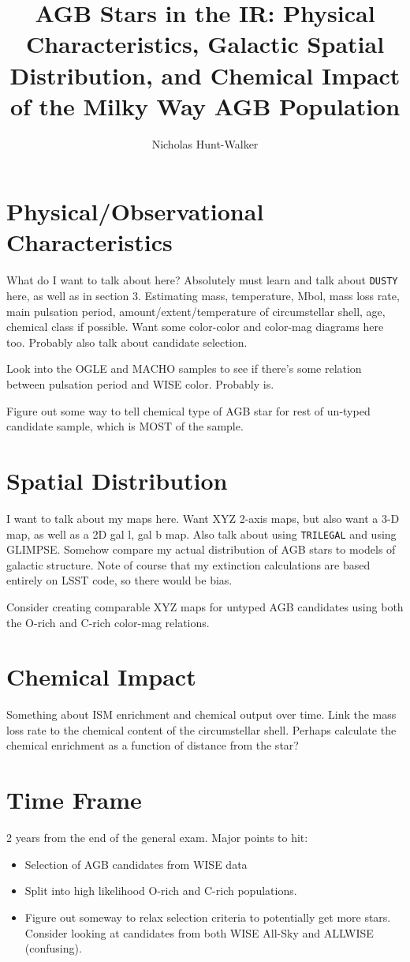 \title{AGB Stars in the IR: Physical Characteristics, Galactic Spatial Distribution, and Chemical Impact of the Milky Way AGB Population}
\author{Nicholas Hunt-Walker}
\maketitle

\section{Physical/Observational Characteristics}
What do I want to talk about here? Absolutely must learn and talk about {\tt DUSTY} here, as well as in section 3.  Estimating mass, temperature, Mbol, mass loss rate, main pulsation period, amount/extent/temperature of circumstellar shell, age, chemical class if possible.  Want some color-color and color-mag diagrams here too.  Probably also talk about candidate selection.

Look into the OGLE and MACHO samples to see if there's some relation between pulsation period and WISE color.  Probably is.

Figure out some way to tell chemical type of AGB star for rest of un-typed candidate sample, which is MOST of the sample.

\section{Spatial Distribution}
I want to talk about my maps here.  Want XYZ 2-axis maps, but also want a 3-D map, as well as a 2D gal l, gal b map.  Also talk about using {\tt TRILEGAL} and using GLIMPSE. Somehow compare my actual distribution of AGB stars to models of galactic structure.  Note of course that my extinction calculations are based entirely on LSST code, so there would be bias.

Consider creating comparable XYZ maps for untyped AGB candidates using both the O-rich and C-rich color-mag relations.

\section{Chemical Impact}
Something about ISM enrichment and chemical output over time. Link the mass loss rate to the chemical content of the circumstellar shell.  Perhaps calculate the chemical enrichment as a function of distance from the star?

\section{Time Frame}
2 years from the end of the general exam.
Major points to hit:
\begin{itemize}
\item Selection of AGB candidates from WISE data
\item Split into high likelihood O-rich and C-rich populations.
\item Figure out someway to relax selection criteria to potentially get more stars.  Consider looking at candidates from both WISE All-Sky and ALLWISE (confusing).
\end{itemize}